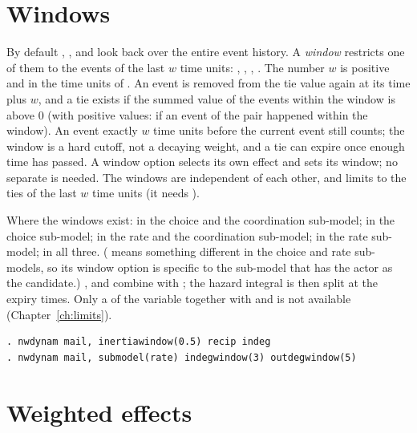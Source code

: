 \section{Windows}\label{sec:windows}

By default , ,  and  look back over the entire event history. A \emph{window} restricts one of them to the events of the last $w$ time units: , , , . The number $w$ is positive and in the time units of . An event is removed from the tie value again at its time plus $w$, and a tie exists if the summed value of the events within the window is above 0 (with positive values: if an event of the pair happened within the window). An event exactly $w$ time units before the current event still counts; the window is a hard cutoff, not a decaying weight, and a tie can expire once enough time has passed. A window option selects its own effect and sets its window; no separate  is needed. The windows are independent of each other, and  limits  to the ties of the last $w$ time units (it needs ).

Where the windows exist:  in the choice and the coordination sub-model;  in the choice sub-model;  in the rate and the coordination sub-model;  in the rate sub-model;  in all three. ( means something different in the choice and rate sub-models, so its window option is specific to the sub-model that has the actor as the candidate.) ,  and  combine with ; the hazard integral is then split at the expiry times. Only a  of the  variable together with  and  is not available (Chapter~\ref{ch:limits}).
\begin{lstlisting}
. nwdynam mail, inertiawindow(0.5) recip indeg
. nwdynam mail, submodel(rate) indegwindow(3) outdegwindow(5)
\end{lstlisting}

\section{Weighted effects}\label{sec:weighted}

